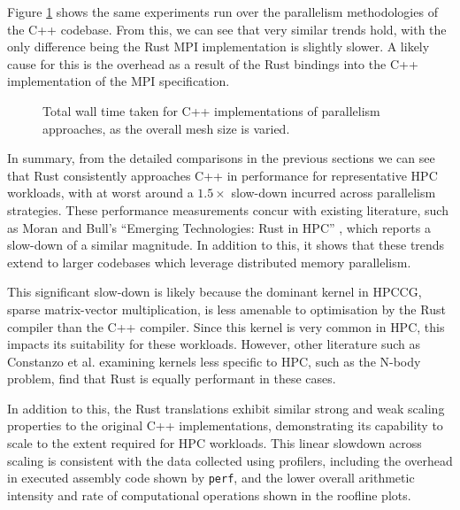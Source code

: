 Figure \ref{fig:translation_parallelism_cpp} shows the same experiments run over the parallelism methodologies of the C++ codebase. From this, we can see that very similar trends hold, with the only difference being the Rust MPI implementation is slightly slower. A likely cause for this is the overhead as a result of the Rust bindings into the C++ implementation of the MPI specification.

\begin{figure}[H]
    \centering
    \fbox{}
    \captionsetup{skip=0pt}
    \caption{Total wall time taken for C++ implementations of parallelism approaches, as the overall mesh size is varied.}
    \label{fig:translation_parallelism_cpp}
\end{figure}

In summary, from the detailed comparisons in the previous sections we can see that Rust consistently approaches C++ in performance for representative \acrshort{HPC} workloads, with at worst around a $1.5 \times$ slow-down incurred across parallelism strategies. These performance measurements concur with existing literature, such as Moran and Bull's ``Emerging Technologies: Rust in HPC'' \cite{moranEmergingTechnologiesRust2023}, which reports a slow-down of a similar magnitude. In addition to this, it shows that these trends extend to larger codebases which leverage distributed memory parallelism.

This significant slow-down is likely because the dominant kernel in \acrshort{HPCCG}, sparse matrix-vector multiplication, is less amenable to optimisation by the Rust compiler than the C++ compiler. Since this kernel is very common in \acrshort{HPC}, this impacts its suitability for these workloads. However, other literature such as Constanzo et al. \cite{costanzoPerformanceVsProgramming2021} examining kernels less specific to \acrshort{HPC}, such as the N-body problem, find that Rust is equally performant in these cases.

In addition to this, the Rust translations exhibit similar strong and weak scaling properties to the original C++ implementations, demonstrating its capability to scale to the extent required for \acrshort{HPC} workloads. This linear slowdown across scaling is consistent with the data collected using profilers, including the overhead in executed assembly code shown by \texttt{perf}, and the lower overall arithmetic intensity and rate of computational operations shown in the roofline plots.
